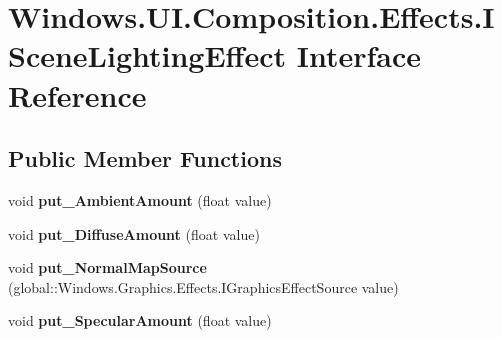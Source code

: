 \hypertarget{interface_windows_1_1_u_i_1_1_composition_1_1_effects_1_1_i_scene_lighting_effect}{}\section{Windows.\+U\+I.\+Composition.\+Effects.\+I\+Scene\+Lighting\+Effect Interface Reference}
\label{interface_windows_1_1_u_i_1_1_composition_1_1_effects_1_1_i_scene_lighting_effect}
\subsection*{Public Member Functions}
\begin{DoxyCompactItemize}
\item 
\mbox{\label{interface_windows_1_1_u_i_1_1_composition_1_1_effects_1_1_i_scene_lighting_effect_a2697d682f51590be31691662ac2c0d31}} 
void {\bfseries put\+\_\+\+Ambient\+Amount} (float value)
\item 
\mbox{\label{interface_windows_1_1_u_i_1_1_composition_1_1_effects_1_1_i_scene_lighting_effect_a7ee00fd07a27405e243932bb66e4dec3}} 
void {\bfseries put\+\_\+\+Diffuse\+Amount} (float value)
\item 
\mbox{\label{interface_windows_1_1_u_i_1_1_composition_1_1_effects_1_1_i_scene_lighting_effect_a26b2c79266ad77b80b29a3faa553ac9f}} 
void {\bfseries put\+\_\+\+Normal\+Map\+Source} (global\+::\+Windows.\+Graphics.\+Effects.\+I\+Graphics\+Effect\+Source value)
\item 
\mbox{\label{interface_windows_1_1_u_i_1_1_composition_1_1_effects_1_1_i_scene_lighting_effect_a0c557dbe5e62bb783fd7f39b259eba96}} 
void {\bfseries put\+\_\+\+Specular\+Amount} (float value)
\item 
\mbox{\label{interface_windows_1_1_u_i_1_1_composition_1_1_effects_1_1_i_scene_lighting_effect_a2697d682f51590be31691662ac2c0d31}} 

\end{DoxyCompactItemize}
